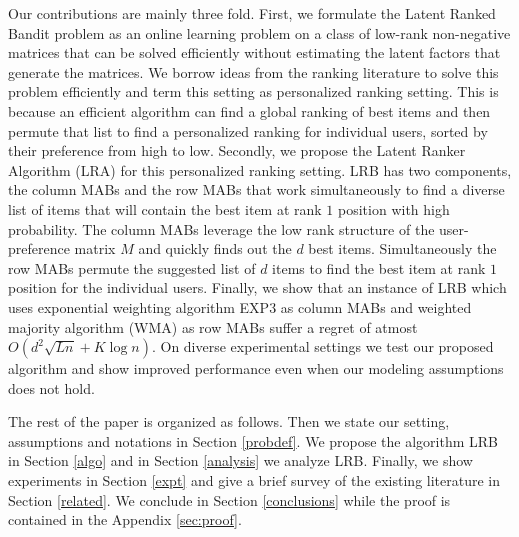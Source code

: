 Our contributions are mainly three fold. First, we formulate the Latent Ranked Bandit problem as an online learning problem on a class of low-rank non-negative matrices that can be solved efficiently without estimating the latent factors that generate the matrices. We borrow ideas from the ranking literature to solve this problem efficiently and term this setting as personalized ranking setting. This is because an efficient algorithm can find a global ranking of best items and then permute that list to find a personalized ranking for individual users, sorted by their preference from high to low. Secondly, we propose the Latent Ranker Algorithm (LRA) for this personalized ranking setting. LRB has two components, the column MABs  and the row MABs that work simultaneously to find a diverse list of items that will contain the best item at rank $1$ position with high probability. The column MABs leverage the low rank structure of the user-preference matrix $M$ and quickly finds out the $d$ best items. Simultaneously the row MABs permute the suggested list of $d$ items to find the best item at rank $1$ position for the individual users. Finally, we show that an instance of LRB which uses exponential weighting algorithm EXP3 as column MABs and weighted majority algorithm (WMA) as row MABs suffer a regret of atmost $O\left(d^2\sqrt{L n} + K \log n\right)$. On diverse experimental settings we test our proposed algorithm and show improved performance even when our modeling assumptions does not hold.

	The rest of the paper is organized as follows. Then we state our setting, assumptions and notations in Section \ref{probdef}. We propose the algorithm LRB in Section \ref{algo} and in Section \ref{analysis} we analyze LRB. Finally, we show experiments in Section \ref{expt} and give a brief survey of the existing literature in Section \ref{related}. We conclude in Section \ref{conclusions} while the proof is contained in the Appendix \ref{sec:proof}.